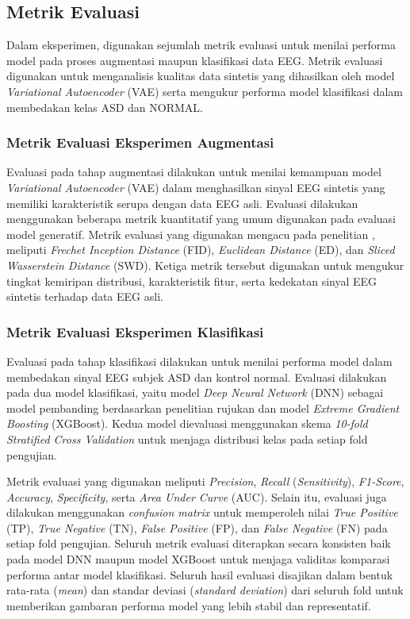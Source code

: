 \subsection{Metrik Evaluasi}

Dalam eksperimen, digunakan sejumlah metrik evaluasi untuk menilai performa model pada proses augmentasi maupun klasifikasi data EEG. Metrik evaluasi digunakan untuk menganalisis kualitas data sintetis yang dihasilkan oleh model \textit{Variational Autoencoder} (VAE) serta mengukur performa model klasifikasi dalam membedakan kelas ASD dan NORMAL.
\subsubsection{Metrik Evaluasi Eksperimen Augmentasi}

Evaluasi pada tahap augmentasi dilakukan untuk menilai kemampuan model \textit{Variational Autoencoder} (VAE) dalam menghasilkan sinyal EEG sintetis yang memiliki karakteristik serupa dengan data EEG asli. Evaluasi dilakukan menggunakan beberapa metrik kuantitatif yang umum digunakan pada evaluasi model generatif. Metrik evaluasi yang digunakan mengacu pada penelitian \cite{eeg_gan}, meliputi \textit{Frechet Inception Distance} (FID), \textit{Euclidean Distance} (ED), dan \textit{Sliced Wasserstein Distance} (SWD). Ketiga metrik tersebut digunakan untuk mengukur tingkat kemiripan distribusi, karakteristik fitur, serta kedekatan sinyal EEG sintetis terhadap data EEG asli.

\subsubsection{Metrik Evaluasi Eksperimen Klasifikasi}

Evaluasi pada tahap klasifikasi dilakukan untuk menilai performa model dalam membedakan sinyal EEG subjek ASD dan kontrol normal. Evaluasi dilakukan pada dua model klasifikasi, yaitu model \textit{Deep Neural Network} (DNN) sebagai model pembanding berdasarkan penelitian rujukan dan model \textit{Extreme Gradient Boosting} (XGBoost). Kedua model dievaluasi menggunakan skema \textit{10-fold Stratified Cross Validation} untuk menjaga distribusi kelas pada setiap fold pengujian.

Metrik evaluasi yang digunakan meliputi \textit{Precision}, \textit{Recall} (\textit{Sensitivity}), \textit{F1-Score}, \textit{Accuracy}, \textit{Specificity}, serta \textit{Area Under Curve} (AUC). Selain itu, evaluasi juga dilakukan menggunakan \textit{confusion matrix} untuk memperoleh nilai \textit{True Positive} (TP), \textit{True Negative} (TN), \textit{False Positive} (FP), dan \textit{False Negative} (FN) pada setiap fold pengujian. Seluruh metrik evaluasi diterapkan secara konsisten baik pada model DNN maupun model XGBoost untuk menjaga validitas komparasi performa antar model klasifikasi. Seluruh hasil evaluasi disajikan dalam bentuk rata-rata (\textit{mean}) dan standar deviasi (\textit{standard deviation}) dari seluruh fold untuk memberikan gambaran performa model yang lebih stabil dan representatif.

